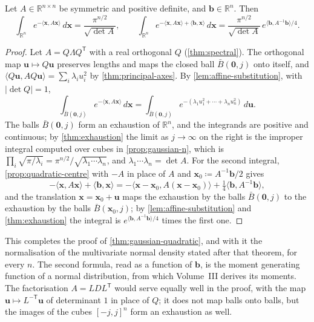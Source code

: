 \begin{theorem}
\label{thm:gaussian-general}
Let $A\in\mathbb R^{n\times n}$ be symmetric and positive definite, and $\mathbf b\in\mathbb R^n$. Then
\[
\int_{\mathbb R^n}e^{-\langle\mathbf x,A\mathbf x\rangle}\,d\mathbf x=\frac{\pi^{n/2}}{\sqrt{\det A}},\qquad\int_{\mathbb R^n}e^{-\langle\mathbf x,A\mathbf x\rangle+\langle\mathbf b,\mathbf x\rangle}\,d\mathbf x=\frac{\pi^{n/2}}{\sqrt{\det A}}\,e^{\langle\mathbf b,A^{-1}\mathbf b\rangle/4}.
\]
\end{theorem}

\begin{proof}
Let $A=Q\Lambda Q^{\mathsf T}$ with a real orthogonal $Q$ (\cref{thm:spectral}). The orthogonal map $\mathbf u\mapsto Q\mathbf u$ preserves lengths and maps the closed ball $\bar B(\mathbf 0,j)$ onto itself, and $\langle Q\mathbf u,AQ\mathbf u\rangle=\sum_i\lambda_iu_i^2$ by \cref{thm:principal-axes}. By \cref{lem:affine-substitution}, with $|\det Q|=1$,
\[
\int_{\bar B(\mathbf 0,j)}e^{-\langle\mathbf x,A\mathbf x\rangle}\,d\mathbf x=\int_{\bar B(\mathbf 0,j)}e^{-(\lambda_1u_1^2+\cdots+\lambda_nu_n^2)}\,d\mathbf u .
\]
The balls $\bar B(\mathbf 0,j)$ form an exhaustion of $\mathbb R^n$, and the integrands are positive and continuous; by \cref{thm:exhaustion} the limit as $j\to\infty$ on the right is the improper integral computed over cubes in \cref{prop:gaussian-n}, which is $\prod_i\sqrt{\pi/\lambda_i}=\pi^{n/2}/\sqrt{\lambda_1\cdots\lambda_n}$, and $\lambda_1\cdots\lambda_n=\det A$. For the second integral, \cref{prop:quadratic-centre} with $-A$ in place of $A$ and $\mathbf x_0\coloneqq A^{-1}\mathbf b/2$ gives
\[
-\langle\mathbf x,A\mathbf x\rangle+\langle\mathbf b,\mathbf x\rangle=-\langle\mathbf x-\mathbf x_0,A(\mathbf x-\mathbf x_0)\rangle+\tfrac14\langle\mathbf b,A^{-1}\mathbf b\rangle ,
\]
and the translation $\mathbf x=\mathbf x_0+\mathbf u$ maps the exhaustion by the balls $\bar B(\mathbf 0,j)$ to the exhaustion by the balls $\bar B(\mathbf x_0,j)$; by \cref{lem:affine-substitution} and \cref{thm:exhaustion} the integral is $e^{\langle\mathbf b,A^{-1}\mathbf b\rangle/4}$ times the first one.
\end{proof}

This completes the proof of \cref{thm:gaussian-quadratic}, and with it the normalisation of the multivariate normal density stated after that theorem, for every $n$. The second formula, read as a function of $\mathbf b$, is the moment generating function of a normal distribution, from which Volume~III derives its moments. The factorisation $A=LDL^{\mathsf T}$ would serve equally well in the proof, with the map $\mathbf u\mapsto L^{-\mathsf T}\mathbf u$ of determinant $1$ in place of $Q$; it does not map balls onto balls, but the images of the cubes $[-j,j]^n$ form an exhaustion as well.

